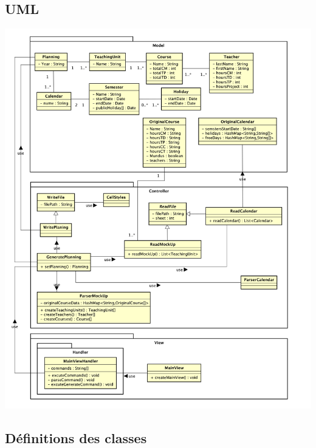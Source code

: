 \documentclass{polytech/polytech}
\begin{document}
	\subsection{UML}
	\includegraphics[scale=0.2]{./img/Diagram.png}

	\pagebreak

	\subsection{Définitions des classes}
\end{document}

